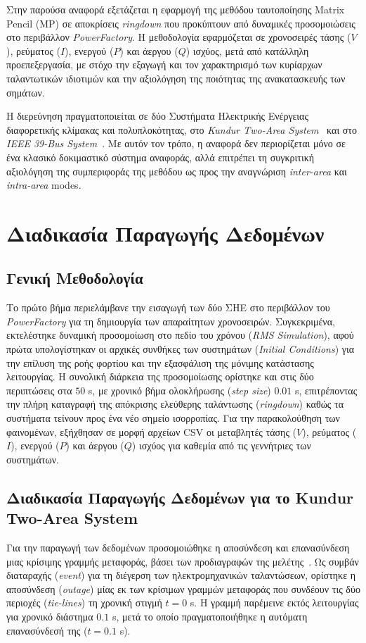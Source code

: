 \documentclass[conference]{IEEEtran}
\begin{document}
Στην παρούσα αναφορά εξετάζεται η εφαρμογή της μεθόδου ταυτοποίησης Matrix Pencil (MP) σε αποκρίσεις \textit{ringdown} που προκύπτουν από δυναμικές προσομοιώσεις στο περιβάλλον \textit{PowerFactory}. Η μεθοδολογία εφαρμόζεται σε χρονοσειρές τάσης ($V$), ρεύματος ($I$), ενεργού ($P$) και άεργου ($Q$) ισχύος, μετά από κατάλληλη προεπεξεργασία, με στόχο την εξαγωγή και τον χαρακτηρισμό των κυρίαρχων ταλαντωτικών ιδιοτιμών και την αξιολόγηση της ποιότητας της ανακατασκευής των σημάτων.

Η διερεύνηση πραγματοποιείται σε δύο Συστήματα Ηλεκτρικής Ενέργειας διαφορετικής κλίμακας και πολυπλοκότητας, στο \textit{Kundur Two-Area System}~\cite{kundur1994} και στο \textit{IEEE 39-Bus System}~\cite{digsilent39,pai1989}. Με αυτόν τον τρόπο, η αναφορά δεν περιορίζεται μόνο σε ένα κλασικό δοκιμαστικό σύστημα αναφοράς, αλλά επιτρέπει τη συγκριτική αξιολόγηση της συμπεριφοράς της μεθόδου ως προς την αναγνώριση \textit{inter-area} και \textit{intra-area} modes.

\section{Διαδικασία Παραγωγής Δεδομένων}
\subsection{Γενική Μεθοδολογία}
Το πρώτο βήμα περιελάμβανε την εισαγωγή των δύο ΣΗΕ στο περιβάλλον του \textit{PowerFactory} για τη δημιουργία των απαραίτητων χρονοσειρών. Συγκεκριμένα, εκτελέστηκε δυναμική προσομοίωση στο πεδίο του χρόνου (\textit{RMS Simulation}), αφού πρώτα υπολογίστηκαν οι αρχικές συνθήκες των συστημάτων (\textit{Initial Conditions}) για την επίλυση της ροής φορτίου και την εξασφάλιση της μόνιμης κατάστασης λειτουργίας. Η συνολική διάρκεια της προσομοίωσης ορίστηκε και στις δύο περιπτώσεις στα $50$ s, με χρονικό βήμα ολοκλήρωσης (\textit{step size}) $0.01$ s, επιτρέποντας την πλήρη καταγραφή της απόκρισης ελεύθερης ταλάντωσης (\textit{ringdown}) καθώς τα συστήματα τείνουν προς ένα νέο σημείο ισορροπίας. Για την παρακολούθηση των φαινομένων, εξήχθησαν σε μορφή αρχείων CSV οι μεταβλητές τάσης ($V$), ρεύματος ($I$), ενεργού ($P$) και άεργου ($Q$) ισχύος για καθεμία από τις γεννήτριες των συστημάτων.

\subsection{Διαδικασία Παραγωγής Δεδομένων για το Kundur Two-Area System}
Για την παραγωγή των δεδομένων προσομοιώθηκε η αποσύνδεση και επανασύνδεση μιας κρίσιμης γραμμής μεταφοράς, βάσει των προδιαγραφών της μελέτης~\cite{firstmeeting2026}. Ως συμβάν διαταραχής (\textit{event}) για τη διέγερση των ηλεκτρομηχανικών ταλαντώσεων, ορίστηκε η αποσύνδεση (\textit{outage}) μίας εκ των κρίσιμων γραμμών μεταφοράς που συνδέουν τις δύο περιοχές (\textit{tie-lines}) τη χρονική στιγμή $t = 0$ s. Η γραμμή παρέμεινε εκτός λειτουργίας για χρονικό διάστημα $0.1$ s, μετά το οποίο πραγματοποιήθηκε η αυτόματη επανασύνδεσή της ($t = 0.1$ s).
\end{document}
